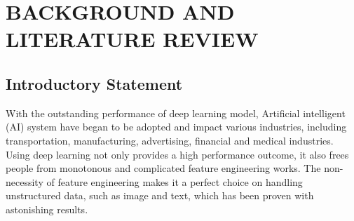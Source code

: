 \section{BACKGROUND AND LITERATURE REVIEW}

\subsection{Introductory Statement}








%  






With the outstanding performance of deep learning model, Artificial intelligent (AI) system have began to be adopted and impact various industries, including transportation, manufacturing, advertising, financial and medical industries. Using deep learning not only provides a high performance outcome, it also frees people from monotonous and complicated feature engineering works. The non-necessity of feature engineering makes it a perfect choice on handling unstructured data, such as image and text, which has been proven with astonishing results. \\


